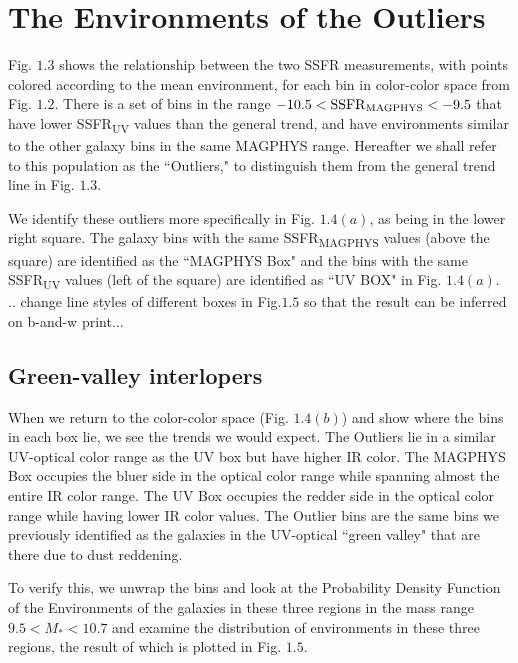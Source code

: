 \section{The Environments of the Outliers}

Fig. $1.3$ shows the relationship between the two SSFR measurements,
with points colored according to the mean environment, for each bin 
in color-color space from Fig. $1.2$. There is a set of bins in 
the range $-10.5 < \mathrm{SSFR\textsubscript{MAGPHYS}}< -9.5$ that 
have lower SSFR\textsubscript{UV} values than the general trend, 
and have environments similar to the other galaxy bins in the same 
MAGPHYS range. Hereafter we shall refer to this population as the 
``Outliers," to distinguish them from the general trend line in 
Fig. $1.3$. 

We identify these outliers more specifically in Fig. $1.4(a)$, as 
being in the lower right square. The galaxy bins with the same 
SSFR\textsubscript{MAGPHYS} values (above the square) are identified 
as the ``MAGPHYS Box" and the bins with the same SSFR\textsubscript{UV} 
values (left of the square) are identified as ``UV BOX" in Fig. 
$1.4(a)$. \\

.. change line styles of different boxes in Fig.$1.5$ so that the result can be inferred on b-and-w print...
  
\subsection{Green-valley interlopers}

When we return to the color-color space (Fig. $1.4(b)$) and 
show where the bins in each box lie, we see the trends we would expect. 
The Outliers lie in a similar UV-optical color range as the UV box but 
have higher IR color. The MAGPHYS Box occupies the bluer side 
in the optical color range while spanning almost the entire IR 
color range. The UV Box occupies the redder side in the optical 
color range while having lower IR color values. The Outlier bins 
are the same bins we previously identified as the galaxies in the 
UV-optical ``green valley" that are there due to dust reddening. 

To verify this, we unwrap the bins and look at the Probability 
Density Function of the Environments of the galaxies in these three regions in the mass range  $ 9.5 < M_{*} < 10.7$ and examine the distribution of environments in these three regions, the result of which is plotted in Fig. $1.5$.

